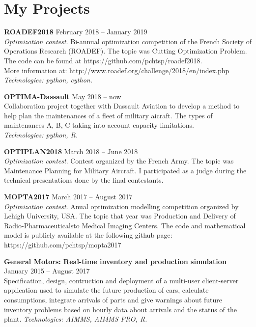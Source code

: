 			\section{My Projects} 
        
\textbf{ROADEF2018} 
	\hfill February 2018 -- January 2019\\
		\textsl{Optimization contest}. Bi-annual optimization competition of the French Society of Operations Research (ROADEF). The topic was Cutting Optimization Problem. The code can be found at https://github.com/pchtsp/roadef2018.\\
		More information at: http://www.roadef.org/challenge/2018/en/index.php \\
		\textsl{Technologies: python, cython.}

\textbf{OPTIMA-Dassault} 
	\hfill May 2018 -- now\\
		Collaboration project together with Dassault Aviation to develop a method to help plan the maintenances of a fleet of military aicraft. The types of maintenances A, B, C taking into account capacity limitations. \\
		\textsl{Technologies: python, R.}

\textbf{OPTIPLAN2018} 
	\hfill March 2018 -- June 2018\\
		\textsl{Optimization contest}. Contest organized by the French Army. The topic was Maintenance Planning for Military Aircraft. I participated as a judge during the technical presentations done by the final contestants.

\textbf{MOPTA2017} 	
	\hfill March 2017 -- August 2017\\
		\textsl{Optimization contest}. Anual optimization modelling competition organized by Lehigh University, USA. The topic that year was Production and Delivery of Radio-Pharmaceuticalsto Medical Imaging Centers. The code and mathematical model is publicly available at the following github page:\\
		https://github.com/pchtsp/mopta2017

\textbf{General Motors: Real-time inventory and production simulation} 
	\hfill January 2015 -- August 2017\\
	Specification, design, contruction and deployment of a multi-user client-server application used to simulate the future production of cars, calculate consumptions, integrate arrivals of parts and give warnings about future inventory problems based on hourly data about arrivals and the status of the plant.
	\textsl{Technologies: AIMMS, AIMMS PRO, R.}

